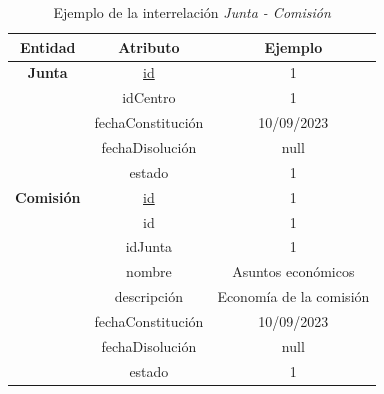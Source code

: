\begin{itemize}
    \begin{table}[H]
    \centering
        \begin{tabular}{ | c | c | c |  }
             \hline
                 \textbf{Entidad} & \textbf{Atributo} & \textbf{Ejemplo}\\       
             \hline
                 \textbf{Junta}  & \underline{id} & 1\\
                  & idCentro & 1\\
                  & fechaConstitución & 10/09/2023\\
                  & fechaDisolución & null\\
                  & estado & 1\\
              \hline
                 \textbf{Comisión}  & \underline{id} & 1\\
                  & id & 1\\
                  & idJunta & 1\\
                  & nombre & Asuntos económicos\\
                  & descripción & Economía de la comisión\\
                  & fechaConstitución & 10/09/2023\\
                  & fechaDisolución & null\\
                  & estado & 1\\
        \end{tabular}
        \caption{Ejemplo de la interrelación \textit{Junta - Comisión}}
        \label{table:I-Ju-Com}
    \end{table}
\end{itemize}

